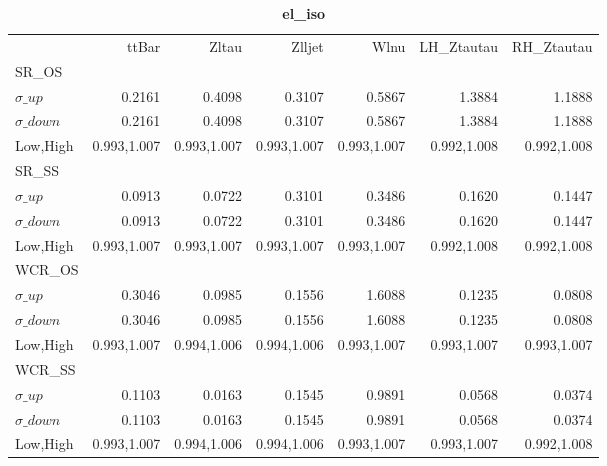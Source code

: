 \documentclass[11pt,oneside,a4paper]{article}
\begin{document}
\begin{table}
\centering
\caption{\bf{el\_iso}}
\begin{tabular}{lrrrrrr}
& ttBar & Zltau & Zlljet & Wlnu & LH\_Ztautau & RH\_Ztautau \\
SR\_OS &  &  &  &  &  &  \\
$\sigma\_up$ & 0.2161 & 0.4098 & 0.3107 & 0.5867 & 1.3884 & 1.1888 \\
$\sigma\_down$ & 0.2161 & 0.4098 & 0.3107 & 0.5867 & 1.3884 & 1.1888 \\
Low,High & 0.993,1.007 & 0.993,1.007 & 0.993,1.007 & 0.993,1.007 & 0.992,1.008 & 0.992,1.008 \\

\hline
SR\_SS &  &  &  &  &  &  \\
$\sigma\_up$ & 0.0913 & 0.0722 & 0.3101 & 0.3486 & 0.1620 & 0.1447 \\
$\sigma\_down$ & 0.0913 & 0.0722 & 0.3101 & 0.3486 & 0.1620 & 0.1447 \\
Low,High & 0.993,1.007 & 0.993,1.007 & 0.993,1.007 & 0.993,1.007 & 0.992,1.008 & 0.992,1.008 \\

\hline
WCR\_OS &  &  &  &  &  &  \\
$\sigma\_up$ & 0.3046 & 0.0985 & 0.1556 & 1.6088 & 0.1235 & 0.0808 \\
$\sigma\_down$ & 0.3046 & 0.0985 & 0.1556 & 1.6088 & 0.1235 & 0.0808 \\
Low,High & 0.993,1.007 & 0.994,1.006 & 0.994,1.006 & 0.993,1.007 & 0.993,1.007 & 0.993,1.007 \\

\hline
WCR\_SS &  &  &  &  &  &  \\
$\sigma\_up$ & 0.1103 & 0.0163 & 0.1545 & 0.9891 & 0.0568 & 0.0374 \\
$\sigma\_down$ & 0.1103 & 0.0163 & 0.1545 & 0.9891 & 0.0568 & 0.0374 \\
Low,High & 0.993,1.007 & 0.994,1.006 & 0.994,1.006 & 0.993,1.007 & 0.993,1.007 & 0.992,1.008 \\

\hline
\end{tabular}
\end{table}
\end{document}
